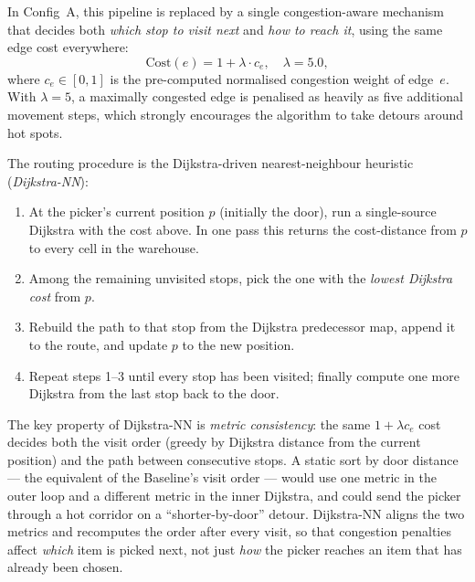 \documentclass[12pt,a4paper]{article}
\begin{document}
In Config~A, this pipeline is replaced by a single congestion-aware
mechanism that decides both \emph{which stop to visit next} and
\emph{how to reach it}, using the same edge cost everywhere:
\[
  \mathrm{Cost}(e) = 1 + \lambda \cdot c_e, \quad \lambda = 5.0,
\]
where $c_e \in [0,1]$ is the pre-computed normalised congestion weight of
edge~$e$.
With $\lambda = 5$, a maximally congested edge is penalised as heavily as
five additional movement steps, which strongly encourages the algorithm
to take detours around hot spots.

The routing procedure is the Dijkstra-driven nearest-neighbour heuristic
(\emph{Dijkstra-NN}):
\begin{enumerate}
  \item At the picker's current position $p$ (initially the door), run a
        single-source Dijkstra with the cost above.
        In one pass this returns the cost-distance from $p$ to every cell
        in the warehouse.
  \item Among the remaining unvisited stops, pick the one with the
        \emph{lowest Dijkstra cost} from $p$.
  \item Rebuild the path to that stop from the Dijkstra predecessor map,
        append it to the route, and update $p$ to the new position.
  \item Repeat steps 1--3 until every stop has been visited; finally
        compute one more Dijkstra from the last stop back to the door.
\end{enumerate}
The key property of Dijkstra-NN is \emph{metric consistency}: the same
$1 + \lambda c_e$ cost decides both the visit order (greedy by Dijkstra
distance from the current position) and the path between consecutive
stops.
A static sort by door distance --- the equivalent of the Baseline's
visit order --- would use one metric in the outer loop and a different
metric in the inner Dijkstra, and could send the picker through a hot
corridor on a ``shorter-by-door'' detour.
Dijkstra-NN aligns the two metrics and recomputes the order after every
visit, so that congestion penalties affect \emph{which} item is picked
next, not just \emph{how} the picker reaches an item that has already
been chosen.
\end{document}
